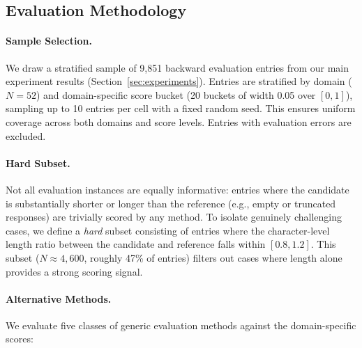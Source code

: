 \documentclass{article} %
\begin{document}
\subsection{Evaluation Methodology} \label{app:alt_eval_method}

\paragraph{Sample Selection.} We draw a stratified sample of 9,851 backward evaluation entries from our main experiment results (Section~\ref{sec:experiments}). Entries are stratified by domain ($N{=}52$) and domain-specific score bucket (20 buckets of width 0.05 over $[0, 1]$), sampling up to 10 entries per cell with a fixed random seed. This ensures uniform coverage across both domains and score levels. Entries with evaluation errors are excluded.

\paragraph{Hard Subset.} Not all evaluation instances are equally informative: entries where the candidate is substantially shorter or longer than the reference (e.g., empty or truncated responses) are trivially scored by any method. To isolate genuinely challenging cases, we define a \textit{hard} subset consisting of entries where the character-level length ratio between the candidate and reference falls within $[0.8, 1.2]$. This subset ($N{\approx}4{,}600$, roughly 47\% of entries) filters out cases where length alone provides a strong scoring signal.

\paragraph{Alternative Methods.} We evaluate five classes of generic evaluation methods against the domain-specific scores:
\end{document}
